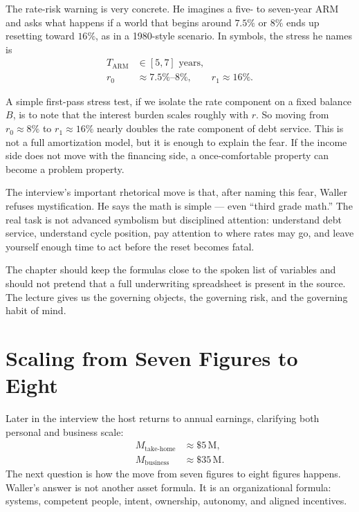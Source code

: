 The rate-risk warning is very concrete. He imagines a five- to seven-year ARM and asks what happens if a world that begins around \(7.5\%\) or \(8\%\) ends up resetting toward \(16\%\), as in a 1980-style scenario. In symbols, the stress he names is
\begin{align}
T_{\mathrm{ARM}} &\in [5,7] \text{ years},\\
r_0 &\approx 7.5\%\text{--}8\%, \qquad r_1 \approx 16\%.
\end{align}

A simple first-pass stress test, if we isolate the rate component on a fixed balance \(B\), is to note that the interest burden scales roughly with \(r\). So moving from \(r_0 \approx 8\%\) to \(r_1 \approx 16\%\) nearly doubles the rate component of debt service. This is not a full amortization model, but it is enough to explain the fear. If the income side does not move with the financing side, a once-comfortable property can become a problem property.

The interview's important rhetorical move is that, after naming this fear, Waller refuses mystification. He says the math is simple --- even ``third grade math.'' The real task is not advanced symbolism but disciplined attention: understand debt service, understand cycle position, pay attention to where rates may go, and leave yourself enough time to act before the reset becomes fatal.

\begin{remark}
The chapter should keep the formulas close to the spoken list of variables and should not pretend that a full underwriting spreadsheet is present in the source. The lecture gives us the governing objects, the governing risk, and the governing habit of mind.
\end{remark}

\section{Scaling from Seven Figures to Eight}

Later in the interview the host returns to annual earnings, clarifying both personal and business scale:
\begin{align}
M_{\text{take-home}} &\approx \$5\,\mathrm{M},\\
M_{\text{business}} &\approx \$35\,\mathrm{M}.
\end{align}
The next question is how the move from seven figures to eight figures happens. Waller's answer is not another asset formula. It is an organizational formula: systems, competent people, intent, ownership, autonomy, and aligned incentives.

